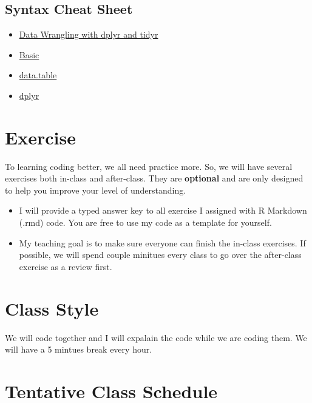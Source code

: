 \documentclass{article}
\begin{document}
\subsection*{Syntax Cheat Sheet}
\begin{itemize}
    \item \hyperlink{https://www.rstudio.com/wp-content/uploads/2015/02/data-wrangling-cheatsheet.pdf}{Data Wrangling
with dplyr and tidyr}
    \item \href{https://web.mit.edu/hackl/www/lab/turkshop/slides/r-cheatsheet.pdf}{Basic}
    \item \href{https://www.beoptimized.be/pdf/R_Data_Transformation.pdf}{data.table} 
    \item \href{https://nyu-cdsc.github.io/learningr/assets/data-transformation.pdf}{dplyr}
\end{itemize}

\section*{Exercise}
To learning coding better, we all need practice more. So, we will have several exercises both in-class and after-class. They are \textbf{optional} and are only designed to help you improve your level of understanding. 
\begin{itemize}
    \item I will provide a typed answer key to all exercise I assigned with R Markdown (.rmd) code. You are free to use my code as a template for yourself.
    \item My teaching goal is to make sure everyone can finish the in-class exercises. If possible, we will spend couple minitues every class to go over the after-class exercise as a review first.   
    
    \end{itemize}


\section*{Class Style}
We will code together and I will expalain the code while we are coding them. We will have a 5 mintues break every hour. 

\section*{Tentative Class Schedule}
\end{document}
